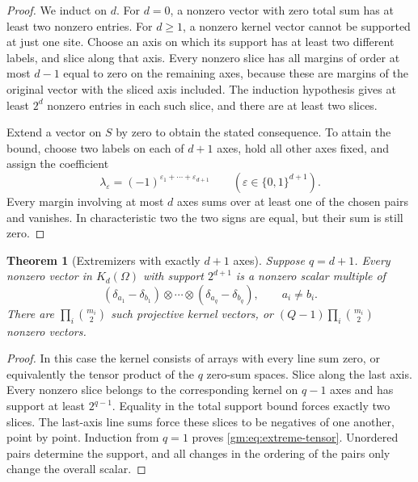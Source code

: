 \documentclass[11pt,a4paper]{article}
\numberwithin{equation}{section}
\newtheorem{theorem}{Theorem}[section]
\theoremstyle{definition}
\theoremstyle{remark}
\newcommand{\1}{\mathbf 1}
\begin{document}
\begin{proof}
We induct on $d$. For $d=0$, a nonzero vector with zero total sum has at
least two nonzero entries. For $d\geq1$, a nonzero kernel vector cannot be
supported at just one site. Choose an axis on which its support has at
least two different labels, and slice along that axis. Every nonzero
slice has all margins of order at most $d-1$ equal to zero on the remaining
axes, because these are margins of the original vector with the sliced
axis included. The induction hypothesis gives at least $2^d$ nonzero
entries in each such slice, and there are at least two slices.

Extend a vector on $S$ by zero to obtain the stated consequence. To attain
the bound, choose two labels on each of $d+1$ axes, hold all other axes
fixed, and assign the coefficient
\[
 \lambda_\varepsilon=(-1)^{\varepsilon_1+\cdots+\varepsilon_{d+1}}
 \qquad(\varepsilon\in\{0,1\}^{d+1}).
\]
Every margin involving at most $d$ axes sums over at least one of the
chosen pairs and vanishes. In characteristic two the two signs are equal,
but their sum is still zero.
\end{proof}

\begin{theorem}[Extremizers with exactly $d+1$ axes]
\label{gm:thm:extremizers}
Suppose $q=d+1$. Every nonzero vector in $K_d(\Omega)$ with support
$2^{d+1}$ is a nonzero scalar multiple of
\begin{equation}\label{gm:eq:extreme-tensor}
 (\delta_{a_1}-\delta_{b_1})\otimes\cdots\otimes
 (\delta_{a_q}-\delta_{b_q}),\qquad a_i\ne b_i.
\end{equation}
There are $\prod_i\binom{m_i}{2}$ such projective kernel vectors, or
$(Q-1)\prod_i\binom{m_i}{2}$ nonzero vectors.
\end{theorem}

\begin{proof}
In this case the kernel consists of arrays with every line sum zero, or
equivalently the tensor product of the $q$ zero-sum spaces. Slice along
the last axis. Every nonzero slice belongs to the corresponding kernel
on $q-1$ axes and has support at least $2^{q-1}$. Equality in the total
support bound forces exactly two slices. The last-axis line sums force
these slices to be negatives of one another, point by point. Induction
from $q=1$ proves \eqref{gm:eq:extreme-tensor}. Unordered pairs determine
the support, and all changes in the ordering of the pairs only change
the overall scalar.
\end{proof}
\end{document}
